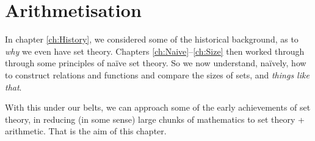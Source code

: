 \documentclass[../../../include/open-logic-section]{subfiles}
\begin{document}
	
\chapter{Arithmetisation}\label{ch:Arithmetisation}
In chapter \ref{ch:History}, we considered some of the historical background, as to \emph{why} we even have set theory. Chapters \ref{ch:Naive}--\ref{ch:Size} then worked through through some principles of na\"ive set theory. So we now understand, na\"ively, how to construct relations and functions and compare the sizes of sets, and \emph{things like that}. 

With this under our belts, we can approach some of the early achievements of set theory, in reducing (in some sense) large chunks of mathematics to set theory + arithmetic. That is the aim of this chapter.


\OLEndChapterHook
\end{document}
